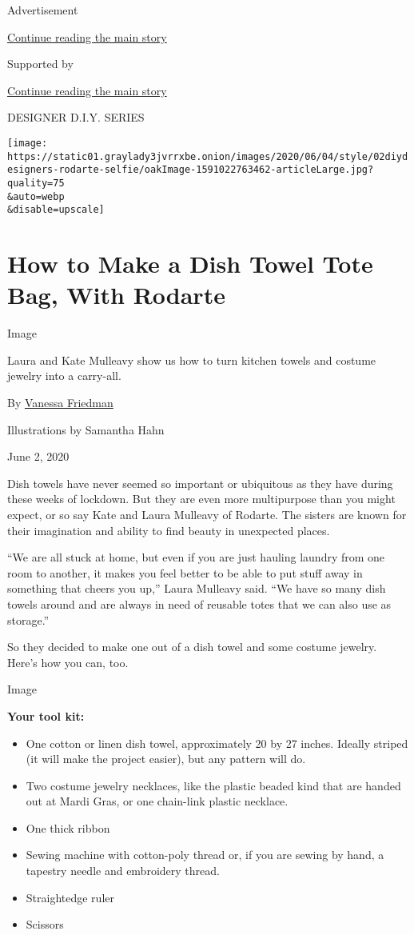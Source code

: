 Advertisement

\protect\hyperlink{after-top}{Continue reading the main story}

Supported by

\protect\hyperlink{after-sponsor}{Continue reading the main story}

DESIGNER D.I.Y. SERIES

\texttt{[image: https://static01.graylady3jvrrxbe.onion/images/2020/06/04/style/02diydesigners-rodarte-selfie/oakImage-1591022763462-articleLarge.jpg?quality=75\\\&auto=webp\\\&disable=upscale]}

\hypertarget{how-to-make-a-dish-towel-tote-bag-with-rodarte}{%
\section{How to Make a Dish Towel Tote Bag, With
Rodarte}\label{how-to-make-a-dish-towel-tote-bag-with-rodarte}}

Image

Laura and Kate Mulleavy show us how to turn kitchen towels and costume
jewelry into a carry-all.

By \href{https://www.nytimes3xbfgragh.onion/by/vanessa-friedman}{Vanessa
Friedman}

Illustrations by Samantha Hahn

June 2, 2020

Dish towels have never seemed so important or ubiquitous as they have
during these weeks of lockdown. But they are even more multipurpose than
you might expect, or so say Kate and Laura Mulleavy of Rodarte. The
sisters are known for their imagination and ability to find beauty in
unexpected places.

``We are all stuck at home, but even if you are just hauling laundry
from one room to another, it makes you feel better to be able to put
stuff away in something that cheers you up,'' Laura Mulleavy said. ``We
have so many dish towels around and are always in need of reusable totes
that we can also use as storage.''

So they decided to make one out of a dish towel and some costume
jewelry. Here's how you can, too.

Image

\textbf{Your tool kit:}

\begin{itemize}
\item
  One cotton or linen dish towel, approximately 20 by 27 inches. Ideally
  striped (it will make the project easier), but any pattern will do.
\item
  Two costume jewelry necklaces, like the plastic beaded kind that are
  handed out at Mardi Gras, or one chain-link plastic necklace.
\item
  One thick ribbon
\item
  Sewing machine with cotton-poly thread or, if you are sewing by hand,
  a tapestry needle and embroidery thread.
\item
  Straightedge ruler
\item
  Scissors
\end{itemize}

